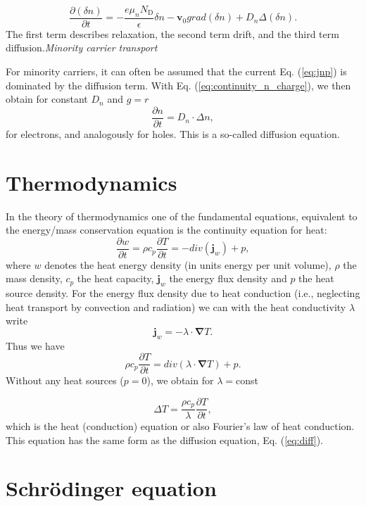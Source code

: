 \[
\frac{\partial\left(  \delta n\right)  }{\partial t}=-\frac{e\mu
_{n}N_{\mathrm{D}}}{\epsilon}\delta n-\mathbf{v}_{0}grad\left(  \delta
n\right)  +D_{n}\Delta\left(  \delta n\right)  .
\]
The first term describes relaxation, the second term drift, and the third term
diffusion.\newline \newline \emph{Minority carrier transport}

For minority carriers, it can often be assumed that the current Eq.
(\ref{eq:jnp}) is dominated by the diffusion term. With Eq.
(\ref{eq:continuity_n_charge}), we then obtain for constant $D_{n}$ and $g=r$
\begin{equation}
\frac{\partial n}{\partial t}=D_{n}\cdot\Delta n, \label{eq:diff}%
\end{equation}
for electrons, and analogously for holes. This is a so-called diffusion equation.

\section{Thermodynamics}

In the theory of thermodynamics one of the fundamental equations, equivalent
to the energy/mass conservation equation is the continuity equation for heat:
\[
\frac{\partial w}{\partial t}=\rho c_{p}\frac{\partial T}{\partial
t}=-div\left(  \mathbf{j}_{w}\right)  +p,
\]
where $w$ denotes the heat energy density (in units energy per unit volume),
$\rho$ the mass density, $c_{p}$ the heat capacity, $\mathbf{j}_{w}$ the
energy flux density and $p$ the heat source density. For the energy flux
density due to heat conduction (i.e., neglecting heat transport by convection
and radiation) we can with the heat conductivity $\lambda$ write
\[
\mathbf{j}_{w}=-\lambda\cdot\mathbf{\nabla}T.
\]
Thus we have
\[
\rho c_{p}\frac{\partial T}{\partial t}=div(\lambda\cdot\mathbf{\nabla}T)+p.
\]
Without any heat sources ($p=0$), we obtain for $\lambda=$const%

\begin{equation}
\Delta T=\frac{\rho c_{p}}{\lambda}\frac{\partial T}{\partial t},
\end{equation}
which is the heat (conduction) equation or also Fourier's law of heat
conduction. This equation has the same form as the diffusion equation, Eq.
(\ref{eq:diff}).

\section{Schr\"odinger equation}


